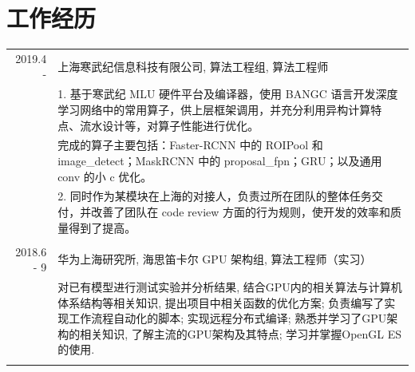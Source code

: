\documentclass[a4paper,11pt]{article}
\begin{document}
\section{工作经历}
\begin{tabular}{r|p{11cm}}
 \textsc{2019.4 - } & 上海寒武纪信息科技有限公司, 算法工程组, 算法工程师 \\&\footnotesize{1. 基于寒武纪 MLU 硬件平台及编译器，使用 BANGC 语言开发深度学习网络中的常用算子，供上层框架调用，并充分利用异构计算特点、流水设计等，对算子性能进行优化。}\\&\footnotesize{完成的算子主要包括：Faster-RCNN 中的 ROIPool 和 image\_detect；MaskRCNN 中的 proposal\_fpn；GRU；以及通用 conv 的小 c 优化。}\\&\footnotesize{2. 同时作为某模块在上海的对接人，负责过所在团队的整体任务交付，并改善了团队在 code review 方面的行为规则，使开发的效率和质量得到了提高。}\\\multicolumn{2}{c}{} \\
 \textsc{2018.6 - 9} & 华为上海研究所, 海思笛卡尔 GPU 架构组, 算法工程师（实习） \\&\footnotesize{对已有模型进行测试实验并分析结果, 结合GPU内的相关算法与计算机体系结构等相关知识, 提出项目中相关函数的优化方案; 负责编写了实现工作流程自动化的脚本; 实现远程分布式编译; 熟悉并学习了GPU架构的相关知识, 了解主流的GPU架构及其特点; 学习并掌握OpenGL ES的使用.}\\\multicolumn{2}{c}{} \\
\end{tabular}

\end{document}
